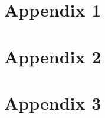 \documentclass[a4paper, 11pt, oneside]{Main}  %
\begin{document}
\listoftables  %



\appendix %

\chapter{Appendix 1}
\chapter{Appendix 2}
\chapter{Appendix 3}

\backmatter

\label{Bibliography}
\end{document}
